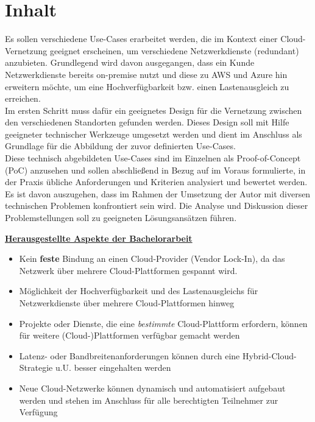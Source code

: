 \section{Inhalt}
Es sollen verschiedene Use-Cases erarbeitet werden, die im Kontext einer Cloud-Vernetzung geeignet erscheinen, um verschiedene Netzwerkdienste (redundant) anzubieten. Grundlegend wird davon ausgegangen, dass ein Kunde Netzwerkdienste bereits on-premise nutzt und diese zu AWS und Azure hin erweitern möchte, um eine Hochverfügbarkeit bzw. einen Lastenausgleich zu erreichen.\\
Im ersten Schritt muss dafür ein geeignetes Design für die Vernetzung zwischen den verschiedenen Standorten gefunden werden. Dieses Design soll mit Hilfe geeigneter technischer Werkzeuge umgesetzt werden und dient im Anschluss als Grundlage für die Abbildung der zuvor definierten Use-Cases.\\
Diese technisch abgebildeten Use-Cases sind im Einzelnen als Proof-of-Concept (PoC) anzusehen und sollen abschließend in Bezug auf im Voraus formulierte, in der Praxis übliche Anforderungen und Kriterien analysiert und bewertet werden. Es ist davon auszugehen, dass im Rahmen der Umsetzung der Autor mit diversen technischen Problemen konfrontiert sein wird. Die Analyse und Diskussion dieser Problemstellungen soll zu geeigneten Lösungsansätzen führen.

\textbf{\underline{Herausgestellte Aspekte der Bachelorarbeit}}
\begin{itemize}
    \item Kein \textbf{feste} Bindung an einen Cloud-Provider (\glqq Vendor Lock-In\grqq{}), da das Netzwerk über mehrere Cloud-Plattformen gespannt wird.
    \item Möglichkeit der Hochverfügbarkeit und des Lastenausgleichs für Netzwerkdienste über mehrere Cloud-Plattformen hinweg
    \item Projekte oder Dienste, die eine \textit{bestimmte} Cloud-Plattform erfordern, können für weitere (Cloud-)Plattformen verfügbar gemacht werden
    \item Latenz- oder Bandbreitenanforderungen können durch eine Hybrid-Cloud-Strategie u.U. besser eingehalten werden
    \item Neue Cloud-Netzwerke können dynamisch und automatisiert aufgebaut werden und stehen im Anschluss für alle berechtigten Teilnehmer zur Verfügung
\end{itemize}

